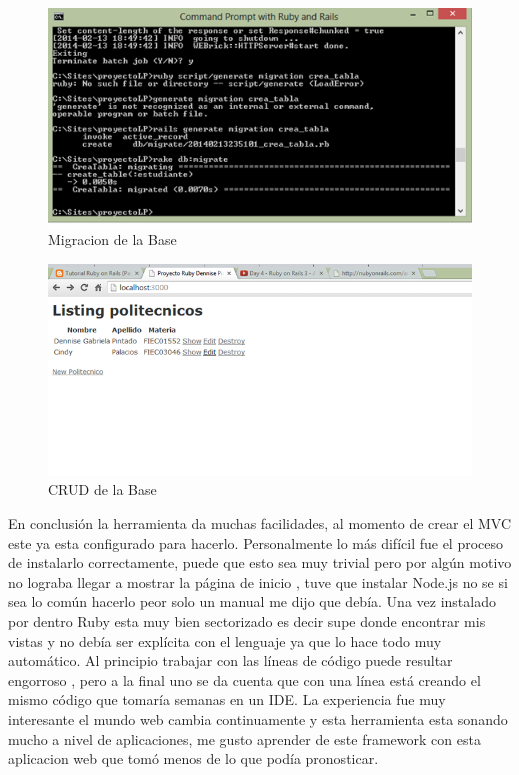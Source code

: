 \begin{figure}
\centering
\includegraphics[scale=0.8]{imagenes/rails5.png}
\caption{Migracion de la Base}
\label{fig: threadsVsSync}
\end{figure}

\begin{figure}
\centering
\includegraphics[scale=0.8]{imagenes/rails8.png}
\caption{CRUD de la Base}
\label{fig: threadsVsSync}
\end{figure}
\newpage

En conclusión la herramienta da muchas facilidades, al momento de crear el MVC este ya esta configurado para hacerlo. Personalmente lo más difícil fue el proceso de instalarlo correctamente, puede que esto sea muy trivial pero por algún motivo no lograba llegar a mostrar la página de inicio , tuve que instalar Node.js no se si sea lo común hacerlo peor solo un manual me dijo que debía. Una vez instalado por dentro Ruby esta muy bien sectorizado es decir supe donde encontrar mis vistas y no debía ser explícita con el lenguaje ya que lo hace todo muy automático. Al principio trabajar con las líneas de código puede resultar engorroso , pero a la final uno se  da cuenta que con una línea está creando el mismo código que tomaría semanas en un IDE. La experiencia fue muy interesante el mundo web cambia continuamente y esta herramienta esta sonando mucho a nivel de aplicaciones, me gusto aprender de este framework con esta aplicacion web que tomó menos de lo que podía pronosticar.

